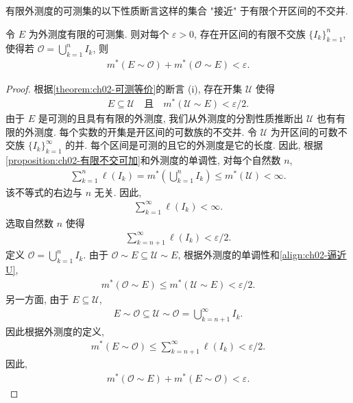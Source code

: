 \documentclass[../../main.tex]{subfiles}
\begin{document}
有限外测度的可测集的以下性质断言这样的集合 "接近" 于有限个开区间的不交并.

\begin{theorem}\label{theorem:ch02-有限区间逼近}
令 $E$ 为外测度有限的可测集. 则对每个 $\varepsilon>0$, 存在开区间的有限不交族 $\{I_{k}\}_{k=1}^{n}$, 使得若 $\mathcal{O}=\bigcup_{k=1}^{n}I_{k}$, 则
\begin{align*}
m^{*}(E\sim\mathcal{O})+m^{*}(\mathcal{O}\sim E)<\varepsilon.
\end{align*}
\end{theorem}

\begin{proof}
根据\cref{theorem:ch02-可测等价}的断言 (i), 存在开集 $\mathcal{U}$ 使得
\begin{align}
E\subseteq\mathcal{U}\quad\text{且}\quad m^{*}(\mathcal{U}\sim E)<\varepsilon/2.\label{align:ch02-逼近U}
\end{align}
由于 $E$ 是可测的且具有有限的外测度, 我们从外测度的分割性质推断出 $\mathcal{U}$ 也有有限的外测度. 每个实数的开集是开区间的可数族的不交并. 令 $\mathcal{U}$ 为开区间的可数不交族 $\{I_{k}\}_{k=1}^{\infty}$ 的并. 每个区间是可测的且它的外测度是它的长度. 因此, 根据\cref{proposition:ch02-有限不交可加}和外测度的单调性, 对每个自然数 $n$,
\begin{align*}
\sum_{k=1}^{n}\ell(I_{k})=m^{*}\left(\bigcup_{k=1}^{n}I_{k}\right)\leqslant m^{*}(\mathcal{U})<\infty.
\end{align*}
该不等式的右边与 $n$ 无关. 因此,
\begin{align*}
\sum_{k=1}^{\infty}\ell(I_{k})<\infty.
\end{align*}
选取自然数 $n$ 使得
\begin{align*}
\sum_{k=n+1}^{\infty}\ell(I_{k})<\varepsilon/2.
\end{align*}
定义 $\mathcal{O}=\bigcup_{k=1}^{n}I_{k}$. 由于 $\mathcal{O}\sim E\subseteq\mathcal{U}\sim E$, 根据外测度的单调性和\eqref{align:ch02-逼近U},
\begin{align*}
m^{*}(\mathcal{O}\sim E)\leqslant m^{*}(\mathcal{U}\sim E)<\varepsilon/2.
\end{align*}
另一方面, 由于 $E\subseteq\mathcal{U}$,
\begin{align*}
E\sim\mathcal{O}\subseteq\mathcal{U}\sim\mathcal{O}=\bigcup_{k=n+1}^{\infty}I_{k}.
\end{align*}
因此根据外测度的定义,
\begin{align*}
m^{*}(E\sim\mathcal{O})\leqslant\sum_{k=n+1}^{\infty}\ell(I_{k})<\varepsilon/2.
\end{align*}
因此,
\begin{align*}
m^{*}(\mathcal{O}\sim E)+m^{*}(E\sim\mathcal{O})<\varepsilon.
\end{align*}
\end{proof}
\end{document}
